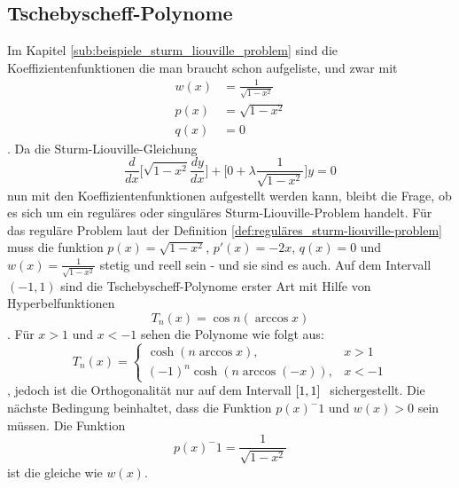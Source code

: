 %
%
%

\subsection{Tschebyscheff-Polynome\label{sub:tschebyscheff-polynome}}
Im Kapitel \ref{sub:beispiele_sturm_liouville_problem} sind die Koeffizientenfunktionen die man braucht schon aufgeliste, und zwar mit
\begin{align*}
	w(x) &= \frac{1}{\sqrt{1-x^2}} \\
	p(x) &= \sqrt{1-x^2} \\
	q(x) &= 0
\end{align*}.
Da die Sturm-Liouville-Gleichung
\begin{equation}
	\label{eq:sturm-liouville-equation}
	\frac{d}{dx}\lbrack \sqrt{1-x^2} \frac{dy}{dx} \rbrack + \lbrack 0 + \lambda \frac{1}{\sqrt{1-x^2}} \rbrack y = 0 
\end{equation}
nun mit den Koeffizientenfunktionen aufgestellt werden kann, bleibt die Frage, ob es sich um ein reguläres oder singuläres Sturm-Liouville-Problem handelt.
Für das reguläre Problem laut der Definition \ref{def:reguläres_sturm-liouville-problem} muss die funktion $p(x) = \sqrt{1-x^2}$, $p'(x) = -2x$, $q(x) = 0$ und $w(x) = \frac{1}{\sqrt{1-x^2}}$ stetig und reell sein - und sie sind es auch.
Auf dem Intervall $(-1,1)$ sind die Tschebyscheff-Polynome erster Art mit Hilfe von Hyperbelfunktionen
\begin{equation}
	T_n(x) = \cos n (\arccos x)
\end{equation}.
Für $x>1$ und $x<-1$ sehen die Polynome wie folgt aus:
\begin{equation}
	T_n(x) = \left\{\begin{array}{ll} \cosh (n \arccos x), & x > 1\\
		(-1)^n \cosh (n \arccos (-x)), & x<-1 \end{array}\right.
\end{equation},
jedoch ist die Orthogonalität nur auf dem Intervall $[\-1, 1 ]\ $ sichergestellt.
Die nächste Bedingung beinhaltet, dass die Funktion $p(x)^-1$ und $w(x)>0$ sein müssen.
Die Funktion
\begin{equation*}
	p(x)^-1 = \frac{1}{\sqrt{1-x^2}}
\end{equation*}
ist die gleiche wie $w(x)$.

